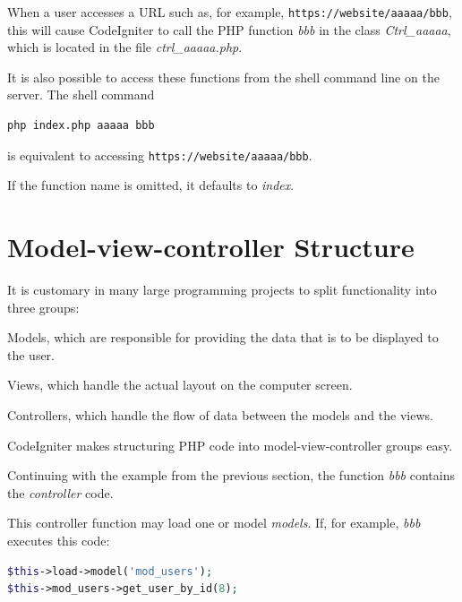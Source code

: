 \documentclass[11pt,oneside,a4paper]{memoir}
\begin{document}
When a user accesses a URL such as, for example, \texttt{https://website/aaaaa/bbb}, this will cause
CodeIgniter to call the PHP function \emph{bbb} in the class \emph{Ctrl\_aaaaa}, which is located in
the file \emph{ctrl\_aaaaa.php}.

It is also possible to access these functions from the shell command line on the server. The shell command

\begin{lstlisting}[language=bash]
php index.php aaaaa bbb
\end{lstlisting}

\noindent
is equivalent to accessing \texttt{https://website/aaaaa/bbb}.

If the function name is omitted, it defaults to \emph{index}.


\section{Model-view-controller Structure}

It is customary in many large programming projects to split functionality into three groups:

\begin{list}{-}{%
    \setlength{\itemsep}{0pt}%
    \setlength{\parsep}{0pt}%
    \setlength{\topsep}{\baselineskip}%
    \setlength{\partopsep}{0pt}%
  }
  \item Models, which are responsible for providing the data that is to be displayed to the user.
  \item Views, which handle the actual layout on the computer screen.
  \item Controllers, which handle the flow of data between the models and the views.
\end{list}

CodeIgniter makes structuring PHP code into model-view-controller groups easy.

Continuing with the example from the previous section, the function \emph{bbb} contains the
\emph{controller} code.

This controller function may load one or model \emph{models}. If, for example, \emph{bbb}
executes this code:

\begin{lstlisting}[language=PHP]
$this->load->model('mod_users');
$this->mod_users->get_user_by_id(8);
\end{lstlisting}
\end{document}
